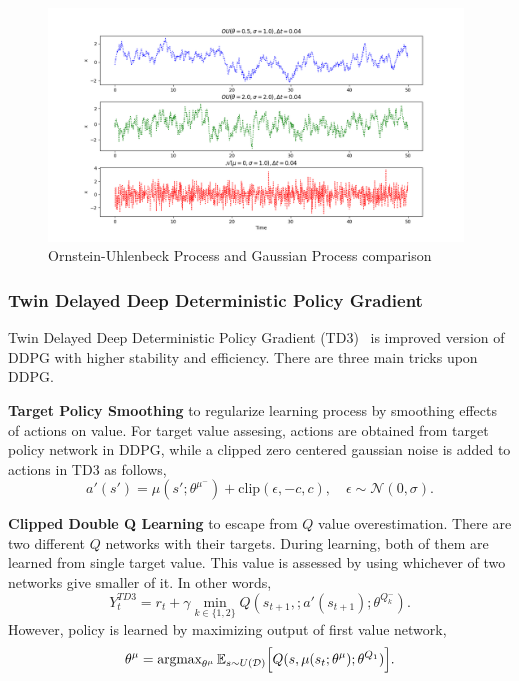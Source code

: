 \begin{figure}
	\centering
	\includegraphics[width=0.98\textwidth]{figures/others/random_processes.png}
	\caption{Ornstein-Uhlenbeck Process and Gaussian Process comparison}
	\label{fig:ou_vs_gaussian}
\end{figure}

\subsubsection{Twin Delayed Deep Deterministic Policy Gradient}
Twin Delayed Deep Deterministic Policy Gradient (TD3)~\cite{fujimoto_addressing_2018} is improved version of DDPG with higher stability and efficiency. 
There are three main tricks upon DDPG. 

\textbf{Target Policy Smoothing} to regularize learning process by smoothing effects of actions on value. For target value assesing, actions are obtained from target policy network in DDPG, while a clipped zero centered gaussian noise is added to actions in TD3 as follows,
\begin{equation}
\label{eqn:td3_target_action}
a'(s') = \mu(s';\theta^{\mu^-}) + \text{clip}(\epsilon, -c, c), \quad \epsilon \sim \mathcal{N}(0, \sigma).
\end{equation}

\textbf{Clipped Double Q Learning} to escape from $Q$ value overestimation. 
There are two different $Q$ networks with their targets. 
During learning, both of them are learned from single target value. 
This value is assessed by using whichever of two networks give smaller of it. In other words, 
\begin{equation}
\label{eqn:td3_target}
Y_t^{TD3} = r_t + \gamma \min_{k\in\{1,2\}} Q(s_{t+1}, ;a'(s_{t+1});\theta^{Q_k^-}).
\end{equation}
However, policy is learned by maximizing output of first value network,
\begin{equation}
\label{eqn:td3_value_maximization}
\theta^\mu = \operatorname{\textup{argmax}}_{\theta^\mu} \mathbb{E}_{s \sim U(\mathcal{D})} \Big[ Q(s, \mu(s_t;\theta^\mu);\theta^{Q_1}) \Big].
\end{equation}

